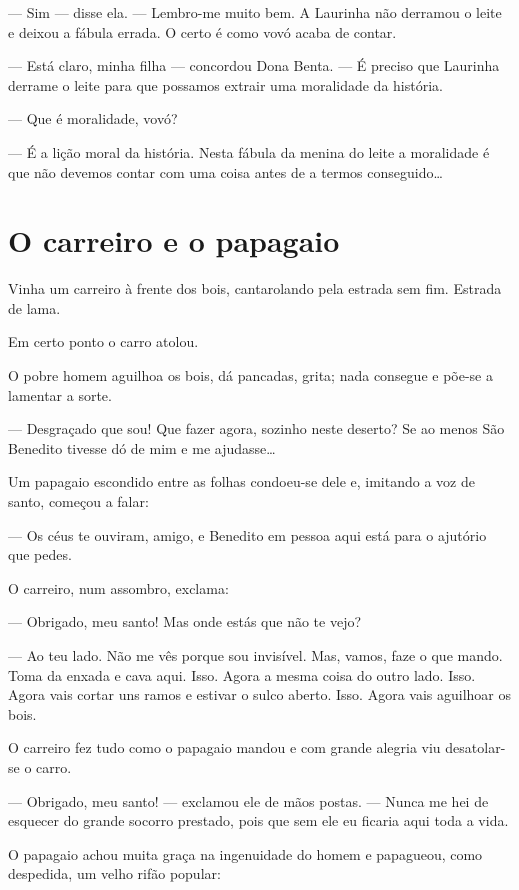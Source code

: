 --- Sim --- disse ela. --- Lembro-me muito bem. A Laurinha não derramou
o leite e deixou a fábula errada. O certo é como vovó acaba de contar.

--- Está claro, minha filha --- concordou Dona Benta. --- É preciso que
Laurinha derrame o leite para que possamos extrair uma moralidade da
história.

--- Que é moralidade, vovó?

--- É a lição moral da história. Nesta fábula da menina do leite a
moralidade é que não devemos contar com uma coisa antes de a termos
conseguido\ldots{}


\chapter{O carreiro e o papagaio}

Vinha um carreiro à frente dos bois, cantarolando pela estrada sem fim.
Estrada de lama.

Em certo ponto o carro atolou.

O pobre homem aguilhoa os bois, dá pancadas, grita; nada consegue e
põe-se a lamentar a sorte.

--- Desgraçado que sou! Que fazer agora, sozinho neste deserto? Se ao
menos São Benedito tivesse dó de mim e me ajudasse\ldots{}

Um papagaio escondido entre as folhas condoeu-se dele e, imitando a voz
de santo, começou a falar:

--- Os céus te ouviram, amigo, e Benedito em pessoa aqui está para o
ajutório que pedes.

O carreiro, num assombro, exclama:

--- Obrigado, meu santo! Mas onde estás que não te vejo?

--- Ao teu lado. Não me vês porque sou invisível. Mas, vamos, faze o que
mando. Toma da enxada e cava aqui. Isso. Agora a mesma coisa do outro
lado. Isso. Agora vais cortar uns ramos e estivar o sulco aberto. Isso.
Agora vais aguilhoar os bois.

O carreiro fez tudo como o papagaio mandou e com grande alegria viu
desatolar-se o carro.

--- Obrigado, meu santo! --- exclamou ele de mãos postas. --- Nunca me
hei de esquecer do grande socorro prestado, pois que sem ele eu ficaria
aqui toda a vida.

O papagaio achou muita graça na ingenuidade do homem e papagueou, como
despedida, um velho rifão popular:

